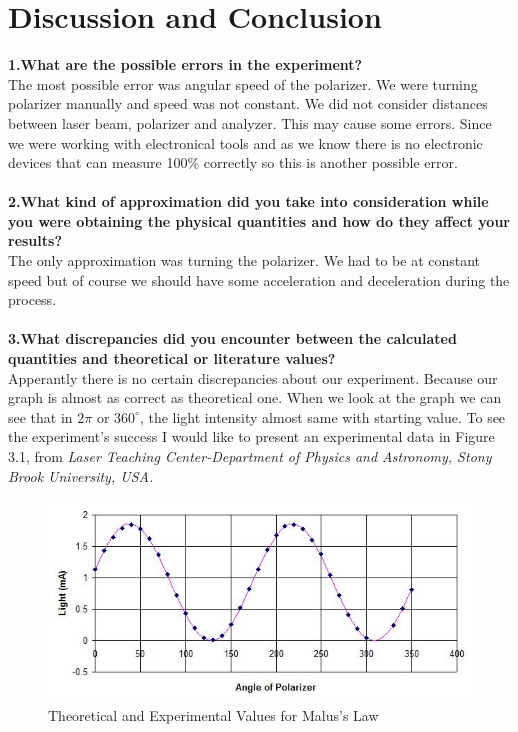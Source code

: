\documentclass[a4paper,12pt]{report}
\begin{document}
\chapter{Discussion and Conclusion}
\textbf{1.What are the possible errors in the experiment?}\\
The most possible error was angular speed of the polarizer. We were turning polarizer manually and speed was not constant. We did not consider distances between laser beam, polarizer and analyzer. This may cause some errors. Since we were working with electronical tools and as we know there is no electronic devices that can measure 100\% correctly so this is another possible error.\\\\
\textbf{2.What kind of approximation did you take into consideration while you were obtaining the physical quantities and how do they affect your results?}\\
The only approximation was turning the polarizer. We had to be at constant speed but of course we should have some acceleration and deceleration during the process.\\\\
\textbf{3.What discrepancies did you encounter between the calculated quantities and theoretical or literature values?}\\
Apperantly there is no certain discrepancies about our experiment. Because our graph is almost as correct as theoretical one. When we look at the graph we can see that in $2\pi$ or $360^{\circ}$, the light intensity almost same with starting value. To see the experiment's success I would like to present an experimental data in Figure 3.1, from \textit{Laser Teaching Center-Department of Physics and Astronomy, Stony Brook University, USA.}
\begin{figure}[h]
\centering
\includegraphics[width=1.0\linewidth, height=0.30\textheight]{stoony}
\caption{Theoretical and Experimental Values for Malus's Law}
\label{fig:stoony}
\end{figure}
\end{document}
